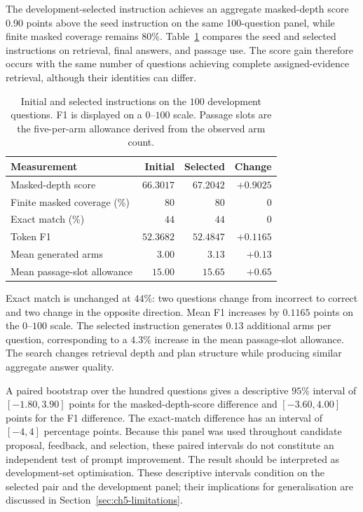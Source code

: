 The development-selected instruction achieves an aggregate masked-depth score 0.90 
points above the seed instruction on the same 100-question panel, while finite masked 
coverage remains $80\%$. Table~\ref{tab:ch5-selected} compares
the seed and selected instructions on retrieval, final answers, and passage
use. The score gain therefore occurs with the same number of questions
achieving complete assigned-evidence retrieval, although their identities
can differ.

\begin{table}[H]
\centering
\small
\caption{Initial and selected instructions on the $100$ development
questions. F1 is displayed on a $0$--$100$ scale. Passage slots are the
five-per-arm allowance derived from the observed arm count.}
\label{tab:ch5-selected}
\begin{tabular}{lrrr}
\hline
Measurement & Initial & Selected & Change \\
\hline
Masked-depth score & $66.3017$ & $67.2042$ & $+0.9025$ \\
Finite masked coverage (\%) & $80$ & $80$ & $0$ \\
Exact match (\%) & $44$ & $44$ & $0$ \\
Token F1 & $52.3682$ & $52.4847$ & $+0.1165$ \\
Mean generated arms & $3.00$ & $3.13$ & $+0.13$ \\
Mean passage-slot allowance & $15.00$ & $15.65$ & $+0.65$ \\
\hline
\end{tabular}
\end{table}

Exact match is unchanged at $44\%$: two questions change from incorrect to
correct and two change in the opposite direction. Mean F1 increases by
$0.1165$ points on the $0$--$100$ scale. The selected instruction generates
$0.13$ additional arms per question, corresponding to a $4.3\%$ increase in
the mean passage-slot allowance. The search changes retrieval depth and plan
structure while producing similar aggregate answer quality.

A paired bootstrap over the hundred questions gives a descriptive $95\%$
interval of $[-1.80,3.90]$ points for the masked-depth-score difference and
$[-3.60,4.00]$ points for the F1 difference. The exact-match difference has
an interval of $[-4,4]$ percentage points. 
Because this panel was used throughout candidate proposal, feedback, and selection, these paired intervals do not constitute an independent test of prompt improvement. The result should be interpreted as development-set optimisation.
These descriptive intervals condition on the selected pair and the development panel; their implications
for generalisation are discussed in Section~\ref{sec:ch5-limitations}.

